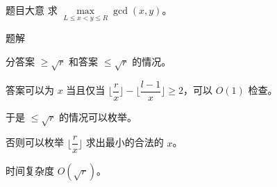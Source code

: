 \begin{frame}{题目大意}
	求 $\max\limits_{L\leq x<y\leq R}\gcd(x,y)$。
\end{frame}

\begin{frame}{题解}

分答案 $\geq \sqrt r$ 和答案 $\leq \sqrt r$ 的情况。\pause

答案可以为 $x$ 当且仅当 $\lfloor \dfrac{r}{x}\rfloor-\lfloor \dfrac{l-1}{x}\rfloor\geq 2$，可以 $O(1)$ 检查。\pause

于是 $\leq \sqrt r$ 的情况可以枚举。\pause

否则可以枚举 $\lfloor \dfrac{r}{x}\rfloor$ 求出最小的合法的 $x$。\pause

时间复杂度 $O(\sqrt r)$。
	
\end{frame}